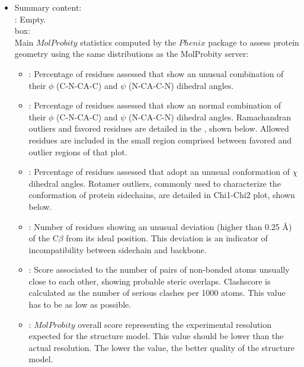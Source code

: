 \begin{itemize}
 \item Summary content:\\
    : Empty.\\
     box:\\Main $MolProbity$ statistics computed by the $Phenix$ package to assess protein geometry using the same distributions as the MolProbity server:
      \begin{itemize}     
        \item {}: Percentage of residues assessed that show an unusual combination of their $\phi$ (C-N-CA-C) and $\psi$ (N-CA-C-N) dihedral angles.
        \item {}: Percentage of residues assessed that show an normal combination of their $\phi$ (C-N-CA-C) and $\psi$ (N-CA-C-N) dihedral angles. Ramachandran outliers and favored residues are detailed in the , shown below. Allowed residues are included in the small region comprised between favored and outlier regions of that plot.
        \item {}: Percentage of residues assessed that adopt an unusual conformation of $\chi$ dihedral angles. Rotamer outliers, commonly used to characterize the conformation of protein sidechains, are detailed in Chi1-Chi2 plot, shown below.
        \item {}: Number of residues showing an unusual deviation (higher than 0.25 \AA) of the C{$\beta$} from its ideal position. This deviation is an indicator of incompatibility between sidechain and backbone. 
        \item {}: Score associated to the number of pairs of non-bonded atoms unsually close to each other, showing probable steric overlaps. Clashscore is calculated as the number of serious clashes per 1000 atoms. This value has to be as low as possible.
        \item {}: $MolProbity$ overall score representing the experimental resolution expected for the structure model. This value should be lower than the actual resolution. The lower the value, the better quality of the structure model.
      \end{itemize}

\end{itemize}
